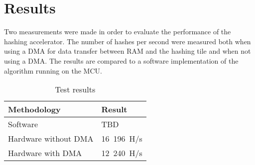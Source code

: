 \chapter{Results}

Two measurements were made in order to evaluate the performance of the hashing accelerator.
The number of hashes per second were measured both when using a DMA for data transfer
between RAM and the hashing tile and when not using a DMA. The results are compared
to a software implementation of the algorithm running on the MCU.

\begin{table}[ht]
	\centering
	\begin{tabular}{|l|l|}
		\hline
		\textbf{Methodology} & \textbf{Result} \\
		\hline
		Software & TBD \\
		Hardware without DMA & 16~196~H/s\\
		Hardware with DMA & 12~240~H/s\\
		\hline
	\end{tabular}

	\caption{Test results}
\end{table}

